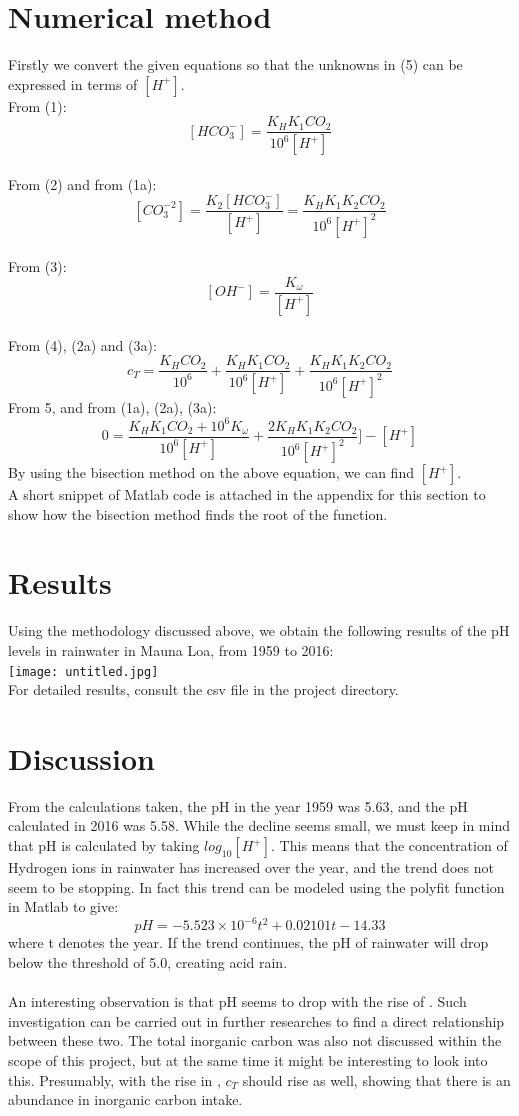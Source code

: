\documentclass[openany]{book}
\begin{document}
	\section{Numerical method}
	Firstly we convert the given equations so that the unknowns in (5) can be expressed in terms of ${[H^+]}$. \\
	From (1):
	\[ [HCO_3^-] = \frac{K_HK_1CO_2}{10^6[H^+]} \tag{1a} \] \\
	From (2) and from (1a):
	\[ [CO_3^{-2}] = \frac{K_2[HCO_3^-]}{[H^+]} \tag{2a} = \frac{K_HK_1K_2CO_2}{10^6[H^+]^2} \] \\
	From (3):
	\[ [OH^-] = \frac{K_\omega}{[H^+]} \tag{3a} \] \\
	From (4), (2a) and (3a):
	\[ c_T = \frac{K_HCO_2}{10^6} + \frac{K_HK_1CO_2}{10^6[H^+]} + \frac{K_HK_1K_2CO_2}{10^6[H^+]^2} \tag{4a} \]
	From 5, and from (1a), (2a), (3a):
	\[ 0 =  \frac{K_HK_1CO_2 + 10^6K_\omega}{10^6[H^+]} + \frac{2K_HK_1K_2CO_2}{10^6[H^+]^2}] - [H^+] \tag{5a} \]
	By using the bisection method on the above equation, we can find ${[H^+]}$. \\
	A short snippet of Matlab code is attached in the appendix for this section to show how the bisection method finds the root of the function. 
	
	\section{Results}
	Using the methodology discussed above, we obtain the following results of the pH levels in rainwater in Mauna Loa, from 1959 to 2016:\\
	\texttt{[image: untitled.jpg]} \\
	For detailed results, consult the csv file in the project directory.
	
	\section{Discussion}
	From the calculations taken, the pH in the year 1959 was 5.63, and the pH calculated in 2016 was 5.58. While the decline seems small, we must keep in mind that pH is calculated by taking ${log_{10}}{[H^+]}$. This means that the concentration of Hydrogen ions in rainwater has increased over the year, and the trend does not seem to be stopping. In fact this trend can be modeled using the polyfit function in Matlab to give:
	\[pH = -5.523 \times 10^{-6}t^2 + 0.02101t - 14.33\] 
	where t denotes the year. If the trend continues, the pH of rainwater will drop below the threshold of 5.0, creating acid rain.\\\\
    An interesting observation is that pH seems to drop with the rise of . Such investigation can be carried out in further researches to find a direct relationship between these two. The total inorganic carbon was also not discussed within the scope of this project, but at the same time it might be interesting to look into this. Presumably, with the rise in , ${c_T}$ should rise as well, showing that there is an abundance in inorganic carbon intake.
\end{document}
